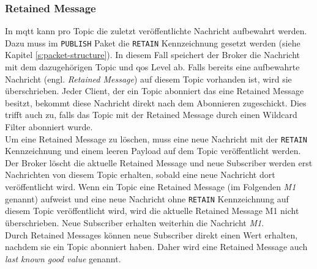\subsubsection{Retained Message} \label{s:retained-messages}
In \ac{mqtt} kann pro Topic die zuletzt veröffentlichte Nachricht aufbewahrt werden.
Dazu muss im \verb|PUBLISH| Paket die \verb|RETAIN| Kennzeichnung gesetzt werden (siehe Kapitel \ref{s:packet-structure}).
In diesem Fall speichert der Broker die Nachricht mit dem dazugehörigen Topic und \ac{qos} Level ab.
Falls bereits eine aufbewahrte Nachricht (engl. \textit{Retained Message}) auf diesem Topic vorhanden ist, wird sie überschrieben.
Jeder Client, der ein Topic abonniert das eine Retained Message besitzt, bekommt diese Nachricht direkt nach dem Abonnieren zugeschickt.
Dies trifft auch zu, falls das Topic mit der Retained Message durch einen Wildcard Filter abonniert wurde.
\cite{teamRetainedMessagesMQTT}
\\
Um eine Retained Message zu löschen, muss eine neue Nachricht mit der \verb|RETAIN| Kennzeichnung und einem leeren Payload auf dem Topic veröffentlicht werden. Der Broker löscht die aktuelle Retained Message und neue Subscriber werden erst Nachrichten von diesem Topic erhalten, sobald eine neue Nachricht dort veröffentlicht wird.
Wenn ein Topic eine Retained Message (im Folgenden \textit{M1} genannt) aufweist und eine neue Nachricht ohne \verb|RETAIN| Kennzeichnung auf diesem Topic veröffentlicht wird, wird die aktuelle Retained Message M1 nicht überschrieben. Neue Subscriber erhalten weiterhin die Nachricht \textit{M1}.
\cite{mqtt5Specification}
\\
Durch Retained Messages können neue Subscriber direkt einen Wert erhalten, nachdem sie ein Topic abonniert haben. Daher wird eine Retained Message auch \textit{last known good value} genannt.
\cite{teamRetainedMessagesMQTT}

